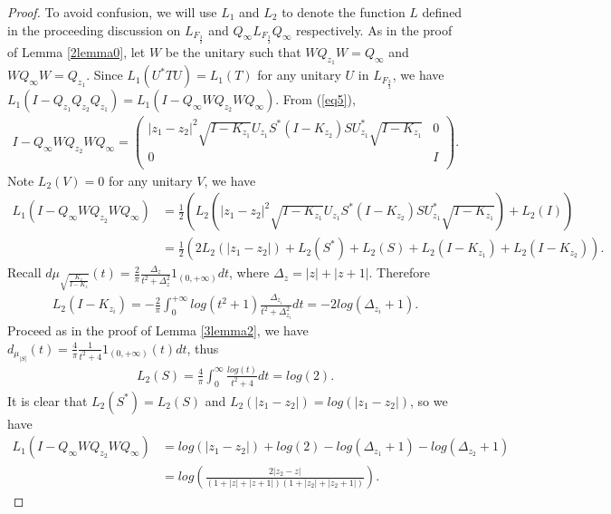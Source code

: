 \documentclass{amsart}
\begin{document}
\begin{proof}
To avoid confusion, we will use $L_{1}$ and $L_2$ to denote the function $L$ defined in the proceeding discussion on $L_{F_{\frac{3}{2}}}$ and 
$Q_{\infty}L_{F_{\frac{3}{2}}} Q_{\infty}$ respectively. 
As in the proof of Lemma \ref{2lemma0}, let $W$ be the unitary such that 
$WQ_{z_1}W = Q_{\infty}$ and $WQ_{\infty}W = Q_{z_1}$. Since $L_{1}(U^{*}TU) = L_{1}(T)$ for any unitary $U$ in $L_{F_{\frac{3}{2}}}$,
we have $L_{1} (I - Q_{z_1}Q_{z_2}Q_{z_1}) = L_{1} (I - Q_{\infty}WQ_{z_2}WQ_{\infty})$. From (\ref{eq5}),
\begin{align*}
I - Q_{\infty}WQ_{z_2}WQ_{\infty} = 
 \left(
        \begin{array}{cc}
          |z_1 - z_2|^{2}\sqrt{I-K_{z_1}}U_{z_1}S^{*}(I-K_{z_2})SU_{z_1}^{*}\sqrt{I-K_{z_1}} & 0 \\
          0 & I \\
        \end{array}
      \right).
\end{align*}
Note $L_{2}(V) = 0$ for any unitary $V$, we have 
\begin{align*}
L_1(I - Q_{\infty}WQ_{z_2}WQ_{\infty}) &= \frac{1}{2}(L_{2}(|z_1 - z_2|^{2}\sqrt{I-K_{z_1}}U_{z_1}S^{*}(I-K_{z_2})SU_{z_1}^{*}\sqrt{I-K_{z_1}}) + L_{2}(I)) \\
                                                              &= \frac{1}{2}(2L_{2}(|z_1 - z_2|) + L_{2}(S^*) + L_{2}(S) + L_{2}(I-K_{z_1}) + L_{2}(I-K_{z_2}) ).
\end{align*}
Recall $d \mu_{\sqrt{\frac{K_z}{I-K_z}}}(t) = \frac{2}{\pi}\frac{\Delta_{z}}{t^2 + \Delta_{z}^2}1_{(0, +\infty)}dt$, where $\Delta_{z} = |z|+|z+1|$. Therefore
\begin{align*}
L_{2}(I - K_{z_{i}}) = -\frac{2}{\pi}\int^{+\infty}_{0}log(t^{2} + 1)\frac{\Delta_{z_i}}{t^{2} + \Delta_{z_i}^{2}}dt  = -2log(\Delta_{z_i} + 1).
\end{align*}
Proceed as in the proof of Lemma \ref{3lemma2}, we have $d_{\mu_{|S|}}(t) = \frac{4}{\pi} \frac{1}{t^2 + 4} 1_{(0, +\infty)}(t)dt$, thus
\begin{align*}
L_{2}(S) = \frac{4}{\pi}\int_{0}^{\infty} \frac{log (t)}{t^2 + 4} dt = log(2).
\end{align*}
It is clear that $L_{2}(S^{*}) = L_{2}(S)$ and $L_{2}(|z_1 - z_2|) = log(|z_1 - z_2|)$, so we have 
\begin{align*}
L_{1}(I - Q_{\infty}WQ_{z_2}WQ_{\infty}) & =  log(|z_1 - z_2|) + log(2) -log(\Delta_{z_1} + 1) - log(\Delta_{z_2} + 1)\\
                     &= log(\frac{2|z_2 - z|}{(1 + |z| + |z+1|)(1 + |z_2| + |z_2 + 1|)}).
\end{align*}
\end{proof}
\end{document}
